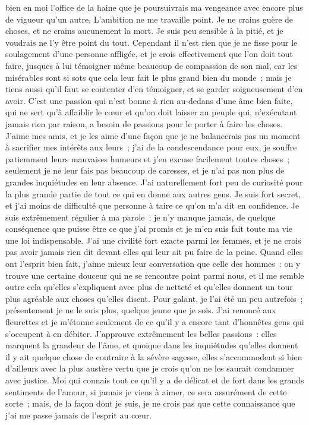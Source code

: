 \documentclass[french,twoside]{book} %
\begin{document}
bien en moi l’office de la haine que je poursuivrais ma vengeance avec encore plus de vigueur qu’un autre. L’ambition ne me travaille point. Je ne crains guère de choses, et ne crains aucunement la mort. Je suis peu sensible à la pitié, et je voudrais ne l’y être point du tout. Cependant il n’est rien que je ne fisse pour le soulagement d’une personne affligée, et je crois effectivement que l’on doit tout faire, jusques à lui témoigner même beaucoup de compassion de son mal, car les misérables sont si sots que cela leur fait le plus grand bien du monde ; mais je tiens aussi qu’il faut se contenter d’en témoigner, et se garder soigneusement d’en avoir. C’est une passion qui n’est bonne à rien au-dedans d’une âme bien faite, qui ne sert qu’à affaiblir le cœur et qu’on doit laisser au peuple qui, n’exécutant jamais rien par raison, a besoin de passions pour le porter à faire les choses. J’aime mes amis, et je les aime d’une façon que je ne balancerais pas un moment à sacrifier mes intérêts aux leurs ; j’ai de la condescendance pour eux, je souffre patiemment leurs mauvaises humeurs et j’en excuse facilement toutes choses ; seulement je ne leur fais pas beaucoup de caresses, et je n’ai pas non plus de grandes inquiétudes en leur absence. J’ai naturellement fort peu de curiosité pour la plus grande partie de tout ce qui en donne aux autres gens. Je suis fort secret, et j’ai moins de difficulté que personne à taire ce qu’on m’a dit en confidence. Je suis extrêmement régulier à ma parole ; je n’y manque jamais, de quelque conséquence que puisse être ce que j’ai promis et je m’en suis fait toute ma vie une loi indispensable. J’ai une civilité fort exacte parmi les femmes, et je ne crois pas avoir jamais rien dit devant elles qui leur ait pu faire de la peine. Quand elles ont l’esprit bien fait, j’aime mieux leur conversation que celle des hommes : on y trouve une certaine douceur qui ne se rencontre point parmi nous, et il me semble outre cela qu’elles s’expliquent avec plus de netteté et qu’elles donnent un tour plus agréable aux choses qu’elles disent. Pour galant, je l’ai été un peu autrefois ; présentement je ne le suis plus, quelque jeune que je sois. J’ai renoncé aux fleurettes et je m’étonne seulement de ce qu’il y a encore tant d’honnêtes gens qui s’occupent à en débiter. J’approuve extrêmement les belles passions : elles marquent la grandeur de l’âme, et quoique dans les inquiétudes qu’elles donnent il y ait quelque chose de contraire à la sévère sagesse, elles s’accommodent si bien d’ailleurs avec la plus austère vertu que je crois qu’on ne les saurait condamner avec justice. Moi qui connais tout ce qu’il y a de délicat et de fort dans les grands sentiments de l’amour, si jamais je viens à aimer, ce sera assurément de cette sorte ; mais, de la façon dont je suis, je ne crois pas que cette connaissance que j’ai me passe jamais de l’esprit au cœur.
\end{document}
